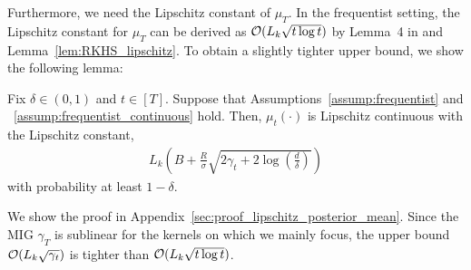 Furthermore, we need the Lipschitz constant of $\mu_T$.
%
In the frequentist setting, the Lipschitz constant for $\mu_T$ can be derived as ${\cal O}(L_k \sqrt{t \log t})$ by Lemma~4 in \citet{vakili2021-optimal} and Lemma~\ref{lem:RKHS_lipschitz}.
%
To obtain a slightly tighter upper bound, we show the following lemma:
\begin{lemma}
    Fix $\delta \in (0, 1)$ and $t \in [T]$.
    Suppose that Assumptions~\ref{assump:frequentist} and ~\ref{assump:frequentist_continuous} hold.
    Then, $\mu_t(\cdot)$ is Lipschitz continuous with the Lipschitz constant,
    \begin{align*}
        L_k \left( B + \frac{R}{\sigma} \sqrt{ 2 \gamma_t + 2 \log \left( \frac{d}{\delta} \right)} \right)
    \end{align*}
    with probability at least $1 - \delta$.
    \label{lem:lipschitz_posterior_mean}
\end{lemma}
We show the proof in Appendix~\ref{sec:proof_lipschitz_posterior_mean}.
%
Since the MIG $\gamma_T$ is sublinear for the kernels on which we mainly focus, the upper bound ${\cal O}(L_k \sqrt{\gamma_t})$ is tighter than ${\cal O}(L_k \sqrt{t \log t})$.



